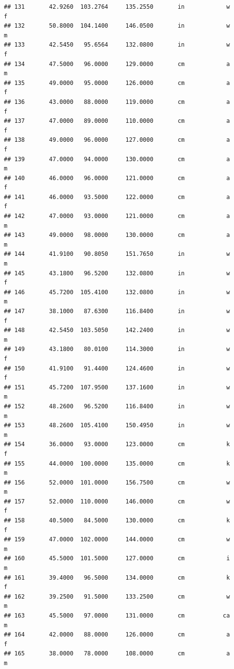 \documentclass[]{article}
\begin{document}
\begin{verbatim}
## 131       42.9260  103.2764     135.2550       in            w         f
## 132       50.8000  104.1400     146.0500       in            w         m
## 133       42.5450   95.6564     132.0800       in            w         f
## 134       47.5000   96.0000     129.0000       cm            a         m
## 135       49.0000   95.0000     126.0000       cm            a         f
## 136       43.0000   88.0000     119.0000       cm            a         f
## 137       47.0000   89.0000     110.0000       cm            a         f
## 138       49.0000   96.0000     127.0000       cm            a         f
## 139       47.0000   94.0000     130.0000       cm            a         m
## 140       46.0000   96.0000     121.0000       cm            a         f
## 141       46.0000   93.5000     122.0000       cm            a         f
## 142       47.0000   93.0000     121.0000       cm            a         m
## 143       49.0000   98.0000     130.0000       cm            a         m
## 144       41.9100   90.8050     151.7650       in            w         m
## 145       43.1800   96.5200     132.0800       in            w         f
## 146       45.7200  105.4100     132.0800       in            w         m
## 147       38.1000   87.6300     116.8400       in            w         f
## 148       42.5450  103.5050     142.2400       in            w         m
## 149       43.1800   80.0100     114.3000       in            w         f
## 150       41.9100   91.4400     124.4600       in            w         f
## 151       45.7200  107.9500     137.1600       in            w         m
## 152       48.2600   96.5200     116.8400       in            w         m
## 153       48.2600  105.4100     150.4950       in            w         m
## 154       36.0000   93.0000     123.0000       cm            k         f
## 155       44.0000  100.0000     135.0000       cm            k         m
## 156       52.0000  101.0000     156.7500       cm            w         m
## 157       52.0000  110.0000     146.0000       cm            w         f
## 158       40.5000   84.5000     130.0000       cm            k         f
## 159       47.0000  102.0000     144.0000       cm            w         m
## 160       45.5000  101.5000     127.0000       cm            i         m
## 161       39.4000   96.5000     134.0000       cm            k         f
## 162       39.2500   91.5000     133.2500       cm            w         m
## 163       45.5000   97.0000     131.0000       cm           ca         m
## 164       42.0000   88.0000     126.0000       cm            a         f
## 165       38.0000   78.0000     108.0000       cm            a         m

\end{verbatim}
\end{document}
